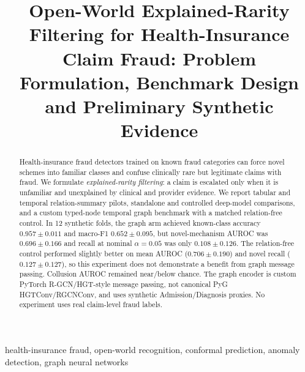 \documentclass[conference]{IEEEtran}
\begin{document}
\title{Open-World Explained-Rarity Filtering for Health-Insurance Claim Fraud: Problem Formulation, Benchmark Design and Preliminary Synthetic Evidence}

\author{
\and
{}
}

\maketitle

\begin{abstract}
Health-insurance fraud detectors trained on known fraud categories can force novel schemes into familiar classes and confuse clinically rare but legitimate claims with fraud. We formulate \emph{explained-rarity filtering}: a claim is escalated only when it is unfamiliar and unexplained by clinical and provider evidence. We report tabular and temporal relation-summary pilots, standalone and controlled deep-model comparisons, and a custom typed-node temporal graph benchmark with a matched relation-free control. In 12 synthetic folds, the graph arm achieved known-class accuracy $0.957\pm0.011$ and macro-F1 $0.652\pm0.095$, but novel-mechanism AUROC was $0.696\pm0.166$ and recall at nominal $\alpha=0.05$ was only $0.108\pm0.126$. The relation-free control performed slightly better on mean AUROC ($0.706\pm0.190$) and novel recall ($0.127\pm0.127$), so this experiment does not demonstrate a benefit from graph message passing. Collusion AUROC remained near/below chance. The graph encoder is custom PyTorch R-GCN/HGT-style message passing, not canonical PyG HGTConv/RGCNConv, and uses synthetic Admission/Diagnosis proxies. No experiment uses real claim-level fraud labels.
\end{abstract}

\begin{IEEEkeywords}
health-insurance fraud, open-world recognition, conformal prediction, anomaly detection, graph neural networks
\end{IEEEkeywords}
\end{document}
